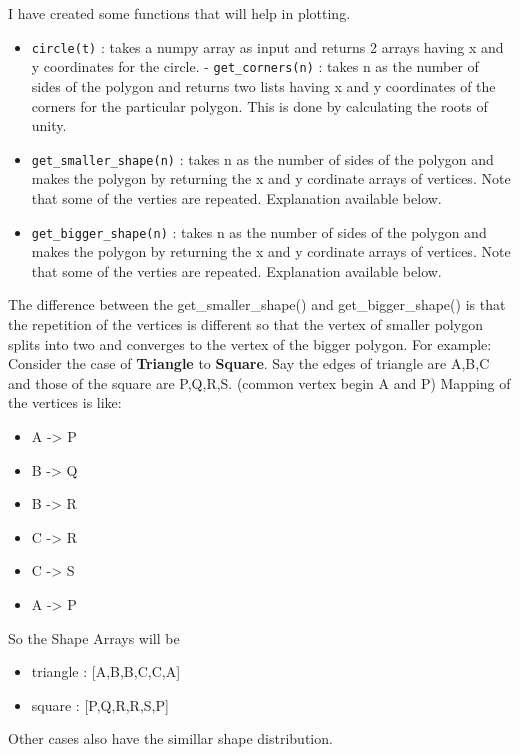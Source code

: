 \documentclass[11pt]{article}
\begin{document}
I have created some functions that will help in plotting. 
\begin{itemize}
    \item \texttt{circle(t)} : takes a numpy array as input and returns 2 arrays
having x and y coordinates for the circle. - \texttt{get\_corners(n)} :
takes n as the number of sides of the polygon and returns two lists
having x and y coordinates of the corners for the particular polygon.
This is done by calculating the roots of unity.
\item \texttt{get\_smaller\_shape(n)} : takes n as the number of sides of the
polygon and makes the polygon by returning the x and y cordinate arrays
of vertices. Note that some of the verties are repeated. Explanation
available below.
\item \texttt{get\_bigger\_shape(n)} : takes n as the
number of sides of the polygon and makes the polygon by returning the x
and y cordinate arrays of vertices. Note that some of the verties are
repeated. Explanation available below.
\end{itemize}
The difference between the
get\_smaller\_shape() and get\_bigger\_shape() is that the repetition of
the vertices is different so that the vertex of smaller polygon splits
into two and converges to the vertex of the bigger polygon. For example:
Consider the case of \textbf{Triangle} to \textbf{Square}. Say the edges
of triangle are A,B,C and those of the square are P,Q,R,S. (common
vertex begin A and P) Mapping of the vertices is like: 
\begin{itemize}
    \item A -\textgreater{} P
    \item B -\textgreater{} Q
    \item B -\textgreater{} R
    \item C -\textgreater{} R
    \item C -\textgreater{} S
    \item A -\textgreater{} P
\end{itemize}
So the Shape Arrays will be 
\begin{itemize}
    \item triangle : {[}A,B,B,C,C,A{]}
    \item square : {[}P,Q,R,R,S,P{]}
\end{itemize}
Other cases also have the simillar shape distribution.
\end{document}
